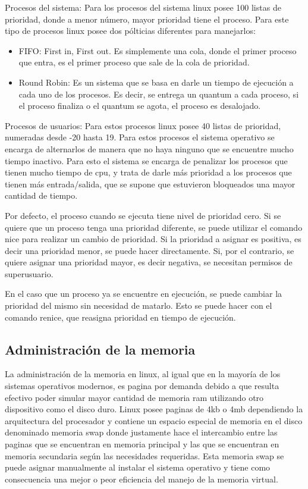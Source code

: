 \documentclass[a4paper, 12pt]{article}
\begin{document}
Procesos del sistema: Para los procesos del sistema linux posee 100 listas de prioridad, donde a menor n\'umero, mayor prioridad tiene el proceso. Para este tipo de procesos linux posee dos p\'olticias diferentes para manejarlos: 
\begin{itemize}
\item FIFO: First in, First out. Es simplemente una cola, donde el primer proceso que entra, es el primer proceso que sale de la cola de prioridad. 
\item Round Robin: Es un sistema que se basa en darle un tiempo de ejecuci\'on a cada uno de los procesos. Es decir, se entrega un quantum a cada proceso, si el proceso finaliza o el quantum se agota, el proceso es desalojado.
\end{itemize}

Procesos de usuarios:
Para estos procesos linux posee 40 listas de prioridad, numeradas desde -20 hasta 19. Para estos procesos el sistema operativo se encarga de alternarlos de manera que no haya ninguno que se encuentre mucho tiempo inactivo. Para esto el sistema se encarga de penalizar los procesos que tienen mucho tiempo de cpu, y trata de darle m\'as prioridad a los procesos que tienen m\'as entrada/salida, que se supone que estuvieron bloqueados una mayor cantidad de tiempo.

Por defecto, el proceso cuando se ejecuta tiene nivel de prioridad cero. Si se quiere que un proceso tenga una prioridad diferente, se puede utilizar el comando nice para realizar un cambio de prioridad. Si la prioridad a asignar es positiva, es decir una prioridad menor, se puede hacer directamente. Si, por el contrario, se quiere asignar una prioridad mayor, es decir negativa, se necesitan permisos de superusuario.

En el caso que un proceso ya se encuentre en ejecuci\'on, se puede cambiar la prioridad del mismo sin necesidad de matarlo. Esto se puede hacer con el comando renice, que reasigna prioridad en tiempo de ejecuci\'on.

\subsection*{Administraci\'on de la memoria}

La administraci\'on de la memoria en linux, al igual que en la mayor\'ia de los sistemas operativos modernos, es pagina por demanda debido a que resulta efectivo poder simular mayor cantidad de memoria ram utilizando otro dispositivo como el disco duro. Linux posee paginas de 4kb o 4mb dependiendo la arquitectura del procesador y contiene un espacio especial de memoria en el disco denominado memoria swap donde justamente hace el intercambio entre las paginas que se encuentran en memoria principal y las que se encuentran en memoria secundaria seg\'un las necesidades requeridas. Esta memoria swap se puede asignar manualmente al instalar el sistema operativo y tiene como consecuencia una mejor o peor eficiencia del manejo de la memoria virtual. 
\end{document}
